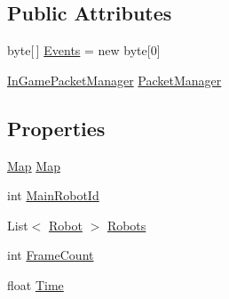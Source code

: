 \subsection*{Public Attributes}
\begin{DoxyCompactItemize}
\item 
byte\mbox{[}$\,$\mbox{]} \hyperlink{classgearit_1_1src_1_1_network_1_1_network_server_game_a1a0fe5e87e19a277f56eaef291a202ba}{Events} = new byte\mbox{[}0\mbox{]}
\item 
\hyperlink{classgearit_1_1src_1_1_network_1_1_in_game_packet_manager}{In\+Game\+Packet\+Manager} \hyperlink{classgearit_1_1src_1_1_network_1_1_network_server_game_aeb268b573555ad9ea17d6f07b7fd39db}{Packet\+Manager}
\end{DoxyCompactItemize}
\subsection*{Properties}
\begin{DoxyCompactItemize}
\item 
\hyperlink{classgearit_1_1src_1_1map_1_1_map}{Map} \hyperlink{classgearit_1_1src_1_1_network_1_1_network_server_game_aabf25bab89aabaed2160401c816ba19e}{Map}
\item 
int \hyperlink{classgearit_1_1src_1_1_network_1_1_network_server_game_a78b64e30a05320751528ae1ca2cbf4cf}{Main\+Robot\+Id}
\item 
List$<$ \hyperlink{classgearit_1_1src_1_1robot_1_1_robot}{Robot} $>$ \hyperlink{classgearit_1_1src_1_1_network_1_1_network_server_game_a5fe67a60f0804da174020fbad53a77f8}{Robots}
\item 
int \hyperlink{classgearit_1_1src_1_1_network_1_1_network_server_game_a0f0619a67ccbe1f398a681fb8f10887c}{Frame\+Count}
\item 
float \hyperlink{classgearit_1_1src_1_1_network_1_1_network_server_game_a86301a5c4b97fd7306a5c59e777e0a8d}{Time}
\end{DoxyCompactItemize}


